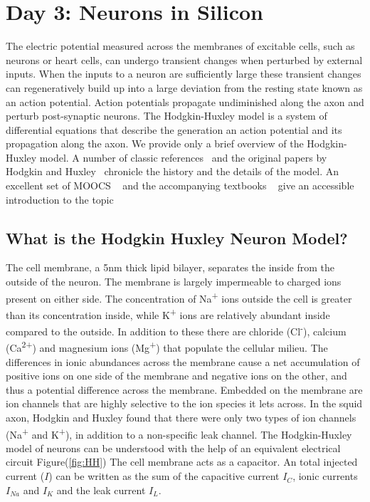 \documentclass[10pt,letterpaper]{article}
\begin{document}
\section*{Day 3: Neurons in Silicon}
The electric potential measured across the membranes of excitable cells, such as neurons or heart cells, can undergo transient changes when perturbed by external inputs. When the inputs to a neuron are sufficiently large these transient changes can regeneratively build up into a large deviation from the resting state known as an action potential. Action potentials propagate undiminished along the axon and perturb post-synaptic neurons. The Hodgkin-Huxley model is a system of differential equations that describe the generation an action potential and its propagation along the axon. We provide only a brief overview of the Hodgkin-Huxley model. A number of classic references~\cite{Dayan2005, Johnston1995} and the original papers by Hodgkin and Huxley~\cite{Huxley1952} chronicle the history and the details of the model. An excellent set of MOOCS ~\cite{gerstnerMOOC, compneuroMOOC} and the accompanying textbooks ~\cite{Gerstner2014,Dayan2005} give an accessible introduction to the topic

\subsection*{What is the Hodgkin Huxley Neuron Model?}
The cell membrane, a 5nm thick lipid bilayer, separates the inside from the outside of the neuron. The membrane is largely impermeable to charged ions present on either side. The concentration of Na\textsuperscript{+} ions outside the cell is greater than its concentration inside, while K\textsuperscript{+} ions are relatively abundant inside compared to the outside. In addition to these there are chloride (Cl\textsuperscript{-}), calcium (Ca\textsuperscript{2+}) and magnesium ions (Mg\textsuperscript{+}) that populate the cellular milieu. The differences in ionic abundances across the membrane cause a net accumulation of positive ions on one side of the membrane and negative ions on the other, and thus a potential difference across the membrane. Embedded on the membrane are ion channels that are highly selective to the ion species it lets across. In the squid axon, Hodgkin and Huxley found that there were only two types of ion channels (Na\textsuperscript{+} and K\textsuperscript{+}), in addition to a non-specific leak channel. The Hodgkin-Huxley model of neurons can be understood with the help of an equivalent electrical circuit Figure(\ref{fig:HH}) The cell membrane acts as a capacitor. An total injected current ($I$) can be written as the sum of the capacitive current $I_{C}$, ionic currents $I_{Na}$ and $I_{K}$ and the leak current $I_L$.
\end{document}
